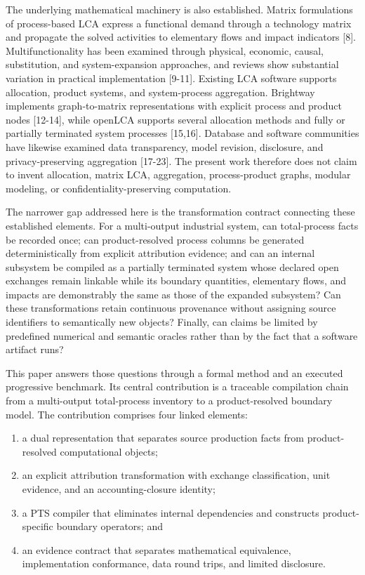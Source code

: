\documentclass[
  10pt,
  a4paper,
  DIV=11,
  numbers=noendperiod]{scrartcl}
\providecommand{\tightlist}{%
  \setlength{\itemsep}{0pt}\setlength{\parskip}{0pt}}
\begin{document}
The underlying mathematical machinery is also established. Matrix
formulations of process-based LCA express a functional demand through a
technology matrix and propagate the solved activities to elementary
flows and impact indicators {[}8{]}. Multifunctionality has been
examined through physical, economic, causal, substitution, and
system-expansion approaches, and reviews show substantial variation in
practical implementation {[}9-11{]}. Existing LCA software supports
allocation, product systems, and system-process aggregation. Brightway
implements graph-to-matrix representations with explicit process and
product nodes {[}12-14{]}, while openLCA supports several allocation
methods and fully or partially terminated system processes {[}15,16{]}.
Database and software communities have likewise examined data
transparency, model revision, disclosure, and privacy-preserving
aggregation {[}17-23{]}. The present work therefore does not claim to
invent allocation, matrix LCA, aggregation, process-product graphs,
modular modeling, or confidentiality-preserving computation.

The narrower gap addressed here is the transformation contract
connecting these established elements. For a multi-output industrial
system, can total-process facts be recorded once; can product-resolved
process columns be generated deterministically from explicit attribution
evidence; and can an internal subsystem be compiled as a partially
terminated system whose declared open exchanges remain linkable while
its boundary quantities, elementary flows, and impacts are demonstrably
the same as those of the expanded subsystem? Can these transformations
retain continuous provenance without assigning source identifiers to
semantically new objects? Finally, can claims be limited by predefined
numerical and semantic oracles rather than by the fact that a software
artifact runs?

This paper answers those questions through a formal method and an
executed progressive benchmark. Its central contribution is a traceable
compilation chain from a multi-output total-process inventory to a
product-resolved boundary model. The contribution comprises four linked
elements:

\begin{enumerate}
\def\labelenumi{\arabic{enumi}.}
\tightlist
\item
  a dual representation that separates source production facts from
  product-resolved computational objects;
\item
  an explicit attribution transformation with exchange classification,
  unit evidence, and an accounting-closure identity;
\item
  a PTS compiler that eliminates internal dependencies and constructs
  product-specific boundary operators; and
\item
  an evidence contract that separates mathematical equivalence,
  implementation conformance, data round trips, and limited disclosure.
\end{enumerate}
\end{document}
